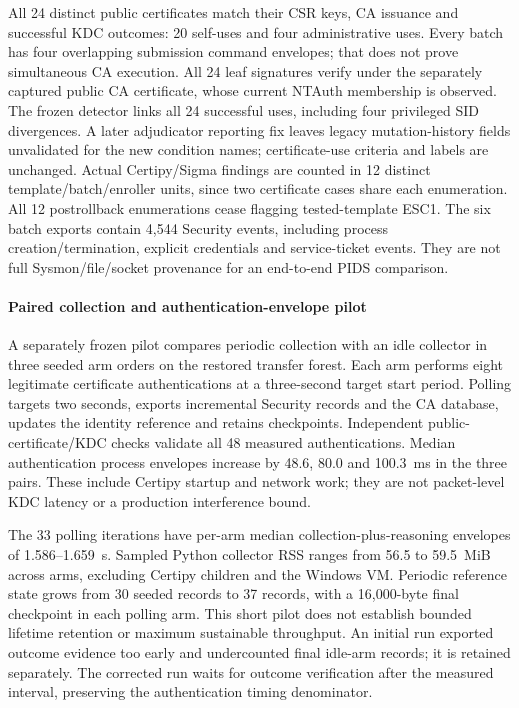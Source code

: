 All 24 distinct public certificates match their CSR keys, CA issuance and successful KDC outcomes: 20 self-uses and four administrative uses. Every batch has four overlapping submission command envelopes; that does not prove simultaneous CA execution. All 24 leaf signatures verify under the separately captured public CA certificate, whose current NTAuth membership is observed. The frozen detector links all 24 successful uses, including four privileged SID divergences. A later adjudicator reporting fix leaves legacy mutation-history fields unvalidated for the new condition names; certificate-use criteria and labels are unchanged. Actual Certipy/Sigma findings are counted in 12 distinct template/batch/enroller units, since two certificate cases share each enumeration. All 12 postrollback enumerations cease flagging tested-template ESC1. The six batch exports contain 4,544 Security events, including process creation/termination, explicit credentials and service-ticket events. They are not full Sysmon/file/socket provenance for an end-to-end PIDS comparison.

\paragraph{Paired collection and authentication-envelope pilot}
A separately frozen pilot compares periodic collection with an idle collector in three seeded arm orders on the restored transfer forest. Each arm performs eight legitimate certificate authentications at a three-second target start period. Polling targets two seconds, exports incremental Security records and the CA database, updates the identity reference and retains checkpoints. Independent public-certificate/KDC checks validate all 48 measured authentications. Median authentication process envelopes increase by 48.6, 80.0 and 100.3~ms in the three pairs. These include Certipy startup and network work; they are not packet-level KDC latency or a production interference bound.

The 33 polling iterations have per-arm median collection-plus-reasoning envelopes of 1.586--1.659~s. Sampled Python collector RSS ranges from 56.5 to 59.5~MiB across arms, excluding Certipy children and the Windows VM. Periodic reference state grows from 30 seeded records to 37 records, with a 16,000-byte final checkpoint in each polling arm. This short pilot does not establish bounded lifetime retention or maximum sustainable throughput. An initial run exported outcome evidence too early and undercounted final idle-arm records; it is retained separately. The corrected run waits for outcome verification after the measured interval, preserving the authentication timing denominator.

